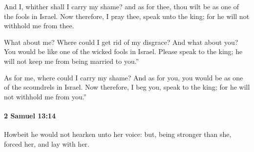 			\begin{versebox}
					\item[BHS] 
					\item[ASV] And I, whither shall I carry my shame? and as for thee, thou wilt be as one of the fools in Israel. Now therefore, I pray thee, speak unto the king; for he will not withhold me from thee.
					\item[NIV] What about me? Where could I get rid of my disgrace? And what about you? You would be like one of the wicked fools in Israel. Please speak to the king; he will not keep me from being married to you.”
					\item[NRSV] As for me, where could I carry my shame? And as for you, you would be as one of the scoundrels in Israel. Now therefore, I beg you, speak to the king; for he will not withhold me from you.”
			\end{versebox}

		\paragraph{2 Samuel 13:14} %
			\label{2SAMUEL-13-14}

			Howbeit he would not hearken unto her voice: but, being stronger than she, forced her, and lay with her.

